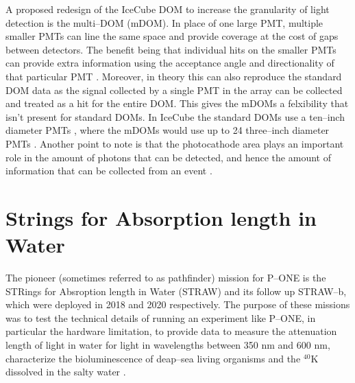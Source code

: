 A proposed redesign of the IceCube DOM to increase the granularity of light detection is the multi--DOM (mDOM). In place of one large PMT, multiple smaller PMTs can line the same space and provide coverage at the cost of gaps between detectors. The benefit being that individual hits on the smaller PMTs can provide extra information using the acceptance angle and directionality of that particular PMT \cite{mpmt}. Moreover, in theory this can also reproduce the standard DOM data as the signal collected by a single PMT in the array can be collected and treated as a hit for the entire DOM. This gives the mDOMs a felxibility that isn't present for standard DOMs. In IceCube the standard DOMs use a ten--inch diameter PMTs \cite{icecube}, where the mDOMs would use up to 24 three--inch diameter PMTs \cite{mpmt}. Another point to note is that the photocathode area plays an important role in the amount of photons that can be detected, and hence the amount of information that can be collected from an event \cite{icecube}. 

\section{Strings for Absorption length in Water}

The pioneer (sometimes referred to as pathfinder) mission for P--ONE is the STRings for Absroption length in Water (STRAW) and its follow up STRAW--b, which were deployed in 2018 and 2020 respectively. The purpose of these missions was to test the technical details of running an experiment like P--ONE, in particular the hardware limitation, to provide data to measure the attenuation length of light in water for light in wavelengths between 350 nm and 600 nm, characterize the bioluminescence of deap--sea living organisms and the $^{40}$K dissolved in the salty water \cite{straw}.

